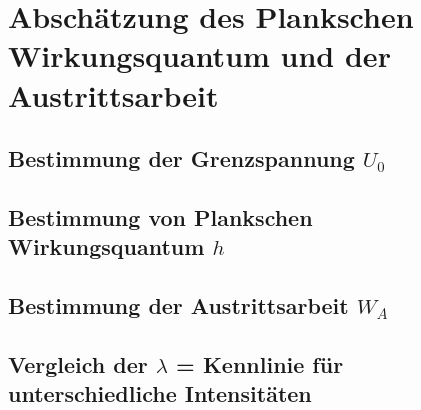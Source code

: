 \section{Abschätzung des Plankschen Wirkungsquantum und der Austrittsarbeit}
\subsection{Bestimmung der Grenzspannung $U_0$}
\subsection{Bestimmung von Plankschen Wirkungsquantum $h$}
\subsection{Bestimmung der Austrittsarbeit $W_A$}
\subsection{Vergleich der $\lambda$ = Kennlinie für unterschiedliche Intensitäten }

